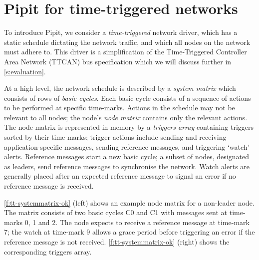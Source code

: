 
\section{Pipit for time-triggered networks}
\label{s:motivation}

To introduce Pipit, we consider a \emph{time-triggered} network driver, which has a static schedule dictating the network traffic, and which all nodes on the network must adhere to.
This driver is a simplification of the Time-Triggered Controller Area Network (TTCAN) bus specification \cite{fuehrer2001time} which we will discuss further in \autoref{s:evaluation}.

At a high level, the network schedule is described by a \emph{system matrix} which consists of rows of \emph{basic cycles}.
Each basic cycle consists of a sequence of actions to be performed at specific time-marks.
Actions in the schedule may not be relevant to all nodes; the node's \emph{node matrix} contains only the relevant actions.
The node matrix is represented in memory by a \emph{triggers array} containing triggers sorted by their time-marks; trigger actions include sending and receiving application-specific messages, sending reference messages, and triggering `watch' alerts.
Reference messages start a new basic cycle; a subset of nodes, designated as leaders, send reference messages to synchronise the network.
Watch alerts are generally placed after an expected reference message to signal an error if no reference message is received.

\autoref{f:tt-systemmatrix-ok} (left) shows an example node matrix for a non-leader node.
The matrix consists of two basic cycles C0 and C1 with messages sent at time-marks 0, 1 and 2.
The node expects to receive a reference message at time-mark 7; the watch at time-mark 9 allows a grace period before triggering an error if the reference message is not received.
\autoref{f:tt-systemmatrix-ok} (right) shows the corresponding triggers array.

